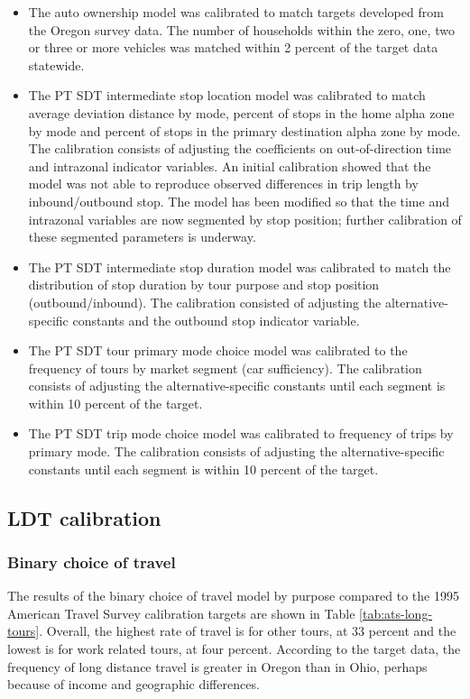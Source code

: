 \begin{itemize}
\item The auto ownership model was calibrated to match targets developed from the Oregon survey data. The number of households within the zero, one, two or three or more vehicles was matched within 2 percent of the target data statewide.
\item The PT SDT intermediate stop location model was calibrated to match average deviation distance by mode, percent of stops in the home alpha zone by mode and percent of stops in the primary destination alpha zone by mode. The calibration consists of adjusting the coefficients on out-of-direction time and intrazonal indicator variables. An initial calibration showed that the model was not able to reproduce observed differences in trip length by inbound/outbound stop. The model has been modified so that the time and intrazonal variables are now segmented by stop position; further calibration of these segmented parameters is underway.
\item The PT SDT intermediate stop duration model was calibrated to match the distribution of stop duration by tour purpose and stop position (outbound/inbound). The calibration consisted of adjusting the alternative-specific constants and the outbound stop indicator variable.
\item The PT SDT tour primary mode choice model was calibrated to the frequency of tours by market segment (car sufficiency). The calibration consists of adjusting the alternative-specific constants until each segment is within 10 percent of the target. 
\item The PT SDT trip mode choice model was calibrated to frequency of trips by primary mode. The calibration consists of adjusting the alternative-specific constants until each segment is within 10 percent of the target.
\end{itemize}

\subsection{LDT calibration}

\subsubsection{Binary choice of travel}
The results of the binary choice of travel model by purpose compared to the 1995 American Travel Survey calibration targets are shown in Table \ref{tab:ats-long-tours}. Overall, the highest rate of travel is for other tours, at 33 percent and the lowest is for work related tours, at four percent. According to the target data, the frequency of long distance travel is greater in Oregon than in Ohio, perhaps because of income and geographic differences.

